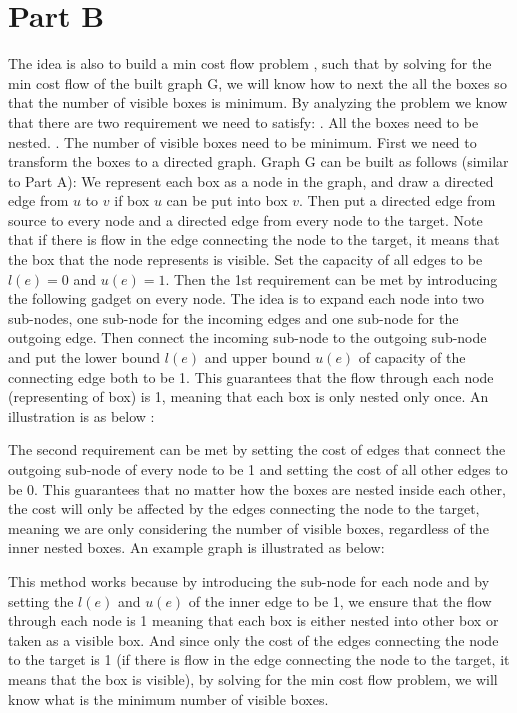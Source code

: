 \documentclass[11pt]{article}
\begin{document}
\section{Part B}
\noindent  The idea is also to build a min cost flow problem , such that by solving for the min cost flow of the built graph G, we will know how to next the all the boxes so that the number of visible boxes is minimum. \newline
\noindent By analyzing the problem we know that there are two requirement we need to satisfy:\newline
{}. All the boxes need to be nested. \newline
{}. The number of visible boxes need to be minimum. \newline
\noindent First we need to transform the boxes to a directed graph.  Graph G can be built as follows (similar to Part A): We represent each box as a node in the graph, and draw a directed edge from $u$ to $v$ if box $u$ can be put into box $v$.  Then put a directed edge from source to every node and a directed edge from every node to the target.  Note that if there is flow in the edge connecting the node to the target, it means that the box that the node represents is visible. Set the capacity of all edges to be $l(e)=0$ and $u(e)=1$. \newline
\noindent Then the 1st requirement can be met by introducing the following gadget on every node. The idea is to expand each node into two sub-nodes, one sub-node for the incoming edges and one sub-node for the outgoing edge. Then connect the incoming sub-node to the outgoing sub-node and put the lower bound $l(e)$ and upper bound $u(e)$ of capacity of the connecting edge both to be 1.  This guarantees that the flow through each node (representing of box) is 1, meaning that each box is only nested only once. An illustration is as below : \newline

\vspace{30mm}

\noindent The second requirement can be met by setting the cost of edges that connect the outgoing sub-node of every node to be 1 and setting the cost of all other edges to be 0. This guarantees that no matter how the boxes are nested inside each other, the cost will only be affected by the edges connecting the node to the target, meaning we are only considering the number of visible boxes, regardless of the inner nested boxes.\newline
\noindent An example graph is illustrated as below:\newline


\vspace{70mm}

\noindent This method works because by introducing the sub-node for each node and by setting the $l(e)$ and $u(e)$ of the inner edge to be 1, we ensure that the flow through each node is 1 meaning that each box is either nested into other box or taken as a visible box. And since only the cost of the edges connecting the node to the target is 1 (if there is flow in the edge connecting the node to the target, it means that the box is visible), by solving for the min cost flow problem, we will know what is the minimum number of visible boxes. 
\end{document}
